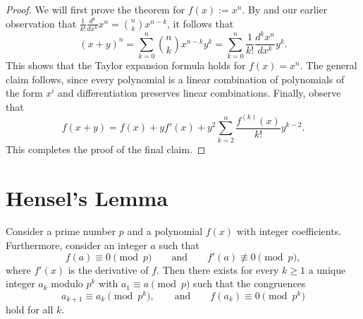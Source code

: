 \begin{proof}
  We will first prove the theorem for $f(x):=x^n$. By  and our earlier observation that $\frac{1}{k!}\frac{d^k}{dx^k}x^n=\binom{n}{k}x^{n-k}$, it follows that
  \begin{equation*}
    (x+y)^n = \sum_{k=0}^{n}\binom{n}{k} x^{n-k}y^{k}=\sum_{k=0}^n\frac{1}{k!}\frac{d^kx^n}{dx^k} y^k.
  \end{equation*}
  This shows that the Taylor expansion formula holds for $f(x)=x^n$. The general claim follows, since every polynomial is a linear combination of polynomials of the form $x^i$ and differentiation preserves linear combinations. Finally, observe that
  \begin{equation*}
    f(x+y)=f(x)+yf'(x) + y^2\sum_{k=2}^n\frac{f^{(k)}(x)}{k!}y^{k-2}.
  \end{equation*}
  This completes the proof of the final claim.
\end{proof}

\section{Hensel's Lemma}

\begin{theorem}\label{theorem:hensels-lemma}
  Consider a prime number $p$ and a polynomial $f(x)$ with integer coefficients. Furthermore, consider an integer $a$ such that
  \begin{equation*}
    f(a)\equiv 0\pmod{p}\qquad\text{and}\qquad f'(a)\nequiv 0\pmod{p},
  \end{equation*}
  where $f'(x)$ is the derivative of $f$. Then there exists for every $k\geq 1$ a unique integer $a_k$ modulo $p^k$ with $a_1\equiv a\pmod{p}$ such that the congruences
  \begin{equation*}
    a_{k+1}\equiv a_k\pmod{p^k},\qquad\text{and}\qquad f(a_k)\equiv 0\pmod{p^k}
  \end{equation*}
  hold for all $k$.
\end{theorem}

